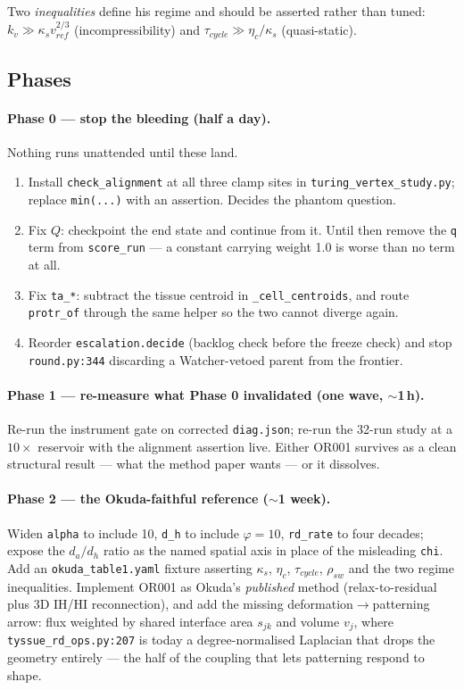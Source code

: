 \documentclass[11pt]{article}
\newcommand{\code}[1]{\texttt{#1}}
\begin{document}
{Two \emph{inequalities} define his regime and should be asserted rather than tuned:
$k_v \gg \kappa_s v_{ref}^{2/3}$ (incompressibility) and $\tau_{cycle} \gg \eta_c/\kappa_s$
(quasi-static).

\subsection{Phases}

\paragraph{Phase 0 --- stop the bleeding (half a day).} Nothing runs unattended until these land.
\begin{enumerate}\itemsep1pt
\item Install \code{check\_alignment} at all three clamp sites in \code{turing\_vertex\_study.py};
      replace \code{min(...)} with an assertion. Decides the phantom question.
\item Fix $Q$: checkpoint the end state and continue from it. Until then remove the \code{q} term
      from \code{score\_run} --- a constant carrying weight 1.0 is worse than no term at all.
\item Fix \code{ta\_*}: subtract the tissue centroid in \code{\_cell\_centroids}, and route
      \code{protr\_of} through the same helper so the two cannot diverge again.
\item Reorder \code{escalation.decide} (backlog check before the freeze check) and stop
      \code{round.py:344} discarding a Watcher-vetoed parent from the frontier.
\end{enumerate}

\paragraph{Phase 1 --- re-measure what Phase 0 invalidated (one wave, $\sim$1\,h).}
Re-run the instrument gate on corrected \code{diag.json}; re-run the 32-run study at a $10\times$
reservoir with the alignment assertion live. Either OR001 survives as a clean structural result ---
what the method paper wants --- or it dissolves.

\paragraph{Phase 2 --- the Okuda-faithful reference ($\sim$1 week).}
Widen \code{alpha} to include 10, \code{d\_h} to include $\varphi = 10$, \code{rd\_rate} to four
decades; expose the $d_a/d_h$ ratio as the named spatial axis in place of the misleading
\code{chi}. Add an \code{okuda\_table1.yaml} fixture asserting $\kappa_s$, $\eta_c$,
$\tau_{cycle}$, $\rho_{sw}$ and the two regime inequalities. Implement OR001 as Okuda's
\emph{published} method (relax-to-residual plus 3D IH/HI reconnection), and add the missing
deformation$\to$patterning arrow: flux weighted by shared interface area $s_{jk}$ and volume $v_j$,
where \code{tyssue\_rd\_ops.py:207} is today a degree-normalised Laplacian that drops the geometry
entirely --- the half of the coupling that lets patterning respond to shape.

}
\end{document}
